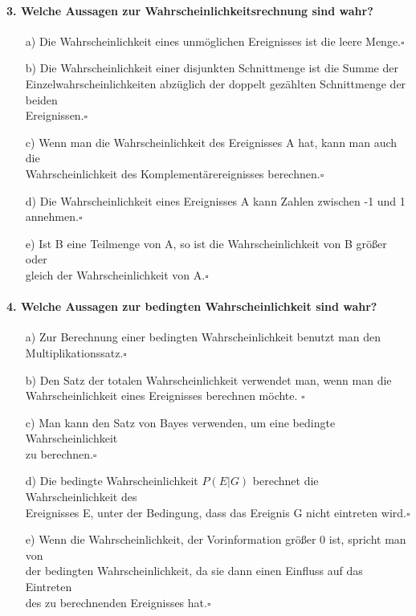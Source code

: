 \documentclass[a4paper]{article}
\begin{document}
\paragraph{3. Welche Aussagen zur Wahrscheinlichkeitsrechnung sind wahr?} 
\begin{itemize}
    \item [a)]Die Wahrscheinlichkeit eines unmöglichen Ereignisses ist die leere Menge.\hfill $\square$
    \item[b)]Die Wahrscheinlichkeit einer disjunkten Schnittmenge ist die Summe der\\ Einzelwahrscheinlichkeiten abzüglich der doppelt gezählten Schnittmenge der beiden \\Ereignissen.\hfill $\square$
    \item[c)]Wenn man die Wahrscheinlichkeit des Ereignisses A hat, kann man auch die\\ Wahrscheinlichkeit des Komplementärereignisses berechnen.\hfill $\square$
    \item[d)] Die Wahrscheinlichkeit eines Ereignisses A kann Zahlen zwischen -1 und 1 annehmen.\hfill $\square$
    \item[e)]Ist B eine Teilmenge von A, so ist die Wahrscheinlichkeit von B größer oder \\gleich der Wahrscheinlichkeit von A.\hfill $\square$
\end{itemize}

\paragraph{4. Welche Aussagen zur bedingten Wahrscheinlichkeit sind wahr?}
\begin{itemize}
    \item[a)]Zur Berechnung einer bedingten Wahrscheinlichkeit benutzt man den\\ Multiplikationssatz.\hfill $\square$
    \item[b)]Den Satz der totalen Wahrscheinlichkeit verwendet man, wenn man die \\Wahrscheinlichkeit eines Ereignisses berechnen möchte.  \hfill $\square$
    \item[c)]Man kann den Satz von Bayes verwenden, um eine bedingte Wahrscheinlichkeit\\ zu berechnen.\hfill $\square$
    \item[d)]Die bedingte Wahrscheinlichkeit $P(E|G)$ berechnet die Wahrscheinlichkeit des\\ Ereignisses E, unter der Bedingung, dass das Ereignis G nicht eintreten wird.\hfill $\square$
    \item[e)]Wenn die Wahrscheinlichkeit, der Vorinformation größer 0 ist, spricht man von \\der bedingten Wahrscheinlichkeit, da sie dann   einen Einfluss auf das Eintreten \\des zu berechnenden Ereignisses hat.\hfill $\square$
\end{itemize}
\end{document}
